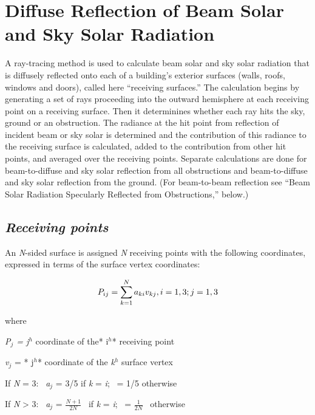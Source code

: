 \section{Diffuse Reflection of Beam Solar and Sky Solar Radiation}\label{diffuse-reflection-of-beam-solar-and-sky-solar-radiation}

A ray-tracing method is used to calculate beam solar and sky solar radiation that is diffusely reflected onto each of a building's exterior surfaces (walls, roofs, windows and doors), called here ``receiving surfaces.'' The calculation begins by generating a set of rays proceeding into the outward hemisphere at each receiving point on a receiving surface. Then it determinines whether each ray hits the sky, ground or an obstruction. The radiance at the hit point from reflection of incident beam or sky solar is determined and the contribution of this radiance to the receiving surface is calculated, added to the contribution from other hit points, and averaged over the receiving points. Separate calculations are done for beam-to-diffuse and sky solar reflection from all obstructions and beam-to-diffuse and sky solar reflection from the ground. (For beam-to-beam reflection see ``Beam Solar Radiation Specularly Reflected from Obstructions,'' below.)

\subsection{\texorpdfstring{\emph{Receiving points}}{Receiving points}}\label{receiving-points}

An \emph{N}-sided surface is assigned \emph{N} receiving points with the following coordinates, expressed in terms of the surface vertex coordinates:

\begin{equation}
{P_{ij}} = \sum\limits_{k = 1}^N {{a_{ki}}{v_{kj}},{\rm{  }}i = 1,3;{\rm{  }}j = 1,3}
\end{equation}

where

\emph{P\(_{j}\) = j\(^{h}\)} coordinate of the* i\(^{h}\)* receiving point

\emph{v\(_{j}\)} = * j\(^{h}\)* coordinate of the \emph{k\(^{h}\)} surface vertex

If \emph{N} = 3:~ \emph{a\(_{j}\)} = 3/5 if \emph{k} = \emph{i};~ = 1/5 otherwise

If \emph{N} \textgreater{} 3:~ \emph{a\(_{j}\)} = \(\frac{{N + 1}}{{2N}}\) ~if \emph{k} = \emph{i};~ = \(\frac{1}{{2N}}\) ~otherwise

